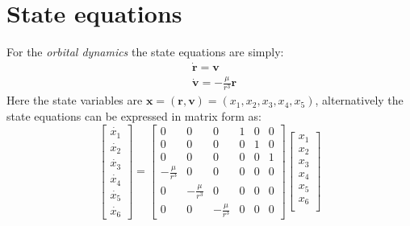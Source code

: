 \section{State equations}
For the \textit{orbital dynamics} the state equations are simply:
\begin{align*}
    &\dot{\mathbf{r}} = \mathbf{v}\\
    &\dot{\mathbf{v}} = -\frac{\mu}{r^3}\mathbf{r}
\end{align*}
Here the state variables are $\mathbf{x}=(\mathbf{r}, \mathbf{v})=(x_1, x_2, x_3, x_4, x_5)$, alternatively the state equations can be expressed in matrix form as: 
\begin{equation*}
    \begin{bmatrix}
        \dot{x_1}\\
        \dot{x_2}\\
        \dot{x_3}\\
        \dot{x_4}\\
        \dot{x_5}\\
        \dot{x_6}
    \end{bmatrix} = \begin{bmatrix}
        0&0&0&1&0&0\\
        0&0&0&0&1&0\\
        0&0&0&0&0&1\\
        -\frac{\mu}{r^3}&0&0&0&0&0\\
        0&-\frac{\mu}{r^3}&0&0&0&0\\
        0&0&-\frac{\mu}{r^3}&0&0&0
    \end{bmatrix}
    \begin{bmatrix}
        x_1\\
        x_2\\
        x_3\\
        x_4\\
        x_5\\
        x_6\\
    \end{bmatrix}
\end{equation*}

